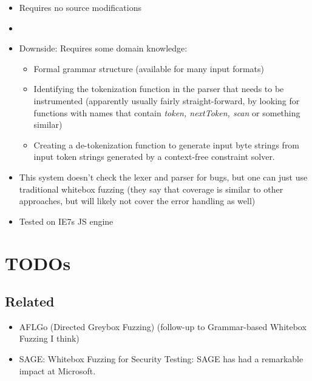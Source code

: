 \documentclass{article}
\begin{document}
\begin{itemize}
  \item Requires no source modifications
  \item {}\cite{GWF}
  \item Downside: Requires some domain knowledge:\begin{itemize}
          \item Formal grammar structure (available for many input formats)
          \item Identifying the tokenization function in the parser that needs to be instrumented (apparently usually fairly straight-forward, by looking for functions with names that contain \textit{token, nextToken, scan} or something similar)
          \item Creating a de-tokenization function to generate input byte strings from input token strings generated by a context-free constraint solver.
        \end{itemize}
  \item This system doesn't check the lexer and parser for bugs, but one can just use traditional whitebox fuzzing (they say that coverage is similar to other approaches, but will likely not cover the error handling as well)
  \item Tested on IE7s JS engine
\end{itemize}

\pagebreak
\section{TODOs}
\subsection{Related}
\begin{itemize}
  \item AFLGo (Directed Greybox Fuzzing)\cite{AFLGo} (follow-up to Grammar-based Whitebox Fuzzing I think)
  \item SAGE: Whitebox Fuzzing for Security Testing: SAGE has had a remarkable impact at Microsoft.\cite{SAGEImpact}
\end{itemize}
\end{document}
